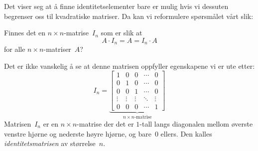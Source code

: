 Det viser seg at å finne identitetselementer bare er mulig hvis vi
dessuten begrenser oss til kvadratiske matriser.  Da kan vi
reformulere spørsmålet vårt slik:

Finnes det en $n \times n$-matrise~$I_n$ som er slik at
\[
A \cdot I_n = A = I_n \cdot A
\]
for alle $n \times n$-matriser~$A$?

Det er ikke vanskelig å se at denne matrisen oppfyller egenskapene vi
er ute etter:
\[
I_n =
\underbrace{
\begin{bmatrix}
1      & 0      & 0      & \cdots & 0 \\
0      & 1      & 0      & \cdots & 0 \\
0      & 0      & 1      & \cdots & 0 \\
\vdots & \vdots & \vdots & \ddots & \vdots \\
0      & 0      & 0      & \cdots & 1
\end{bmatrix}
}_{\text{$n \times n$-matrise}}
\]
Matrisen~$I_n$ er en $n \times n$-matrise der det er $1$-tall langs
diagonalen mellom øverste venstre hjørne og nederste høyre hjørne, og
bare~$0$ ellers.  Den kalles \emph{identitetsmatrisen} av
størrelse~$n$.

